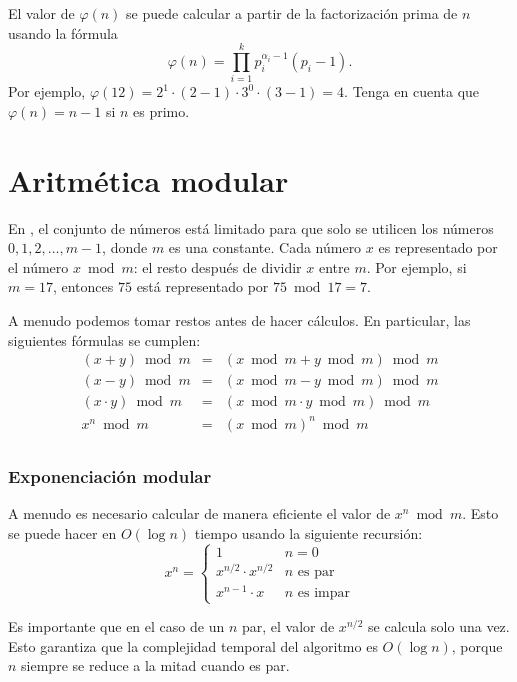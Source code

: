 El valor de $\varphi(n)$ se puede calcular
a partir de la factorización prima de $n$
usando la fórmula
\[ \varphi(n) = \prod_{i=1}^k p_i^{\alpha_i-1}(p_i-1). \]
Por ejemplo, $\varphi(12)=2^1 \cdot (2-1) \cdot 3^0 \cdot (3-1)=4$.
Tenga en cuenta que $\varphi(n)=n-1$ si $n$ es primo.

\section{Aritmética modular}


En ,
el conjunto de números está limitado para que
solo se utilicen los números $0,1,2,\ldots,m-1$,
donde $m$ es una constante.
Cada número $x$ es
representado por el número $x \bmod m$:
el resto después de dividir $x$ entre $m$.
Por ejemplo, si $m=17$, entonces $75$
está representado por $75 \bmod 17 = 7$.

A menudo podemos tomar restos antes de hacer
cálculos.
En particular, las siguientes fórmulas se cumplen:
\[
\begin{array}{rcl}
(x+y) \bmod m & = & (x \bmod m + y \bmod m) \bmod m \\
(x-y) \bmod m & = & (x \bmod m - y \bmod m) \bmod m \\
(x \cdot y) \bmod m & = & (x \bmod m \cdot y \bmod m) \bmod m \\
x^n \bmod m & = & (x \bmod m)^n \bmod m \\
\end{array}
\]

\subsubsection{Exponenciación modular}

A menudo es necesario calcular de manera eficiente
el valor de $x^n \bmod m$.
Esto se puede hacer en $O(\log n)$ tiempo
usando la siguiente recursión:
\begin{equation*}
    x^n = \begin{cases}
               1        & n = 0\\
               x^{n/2} \cdot x^{n/2} & \text{$n$ es par}\\
               x^{n-1} \cdot x & \text{$n$ es impar}
           \end{cases}
\end{equation*}

Es importante que en el caso de un $n$ par,
el valor de $x^{n/2}$ se calcula solo una vez.
Esto garantiza que la complejidad temporal del
algoritmo es $O(\log n)$, porque $n$ siempre se reduce a la mitad
cuando es par.

